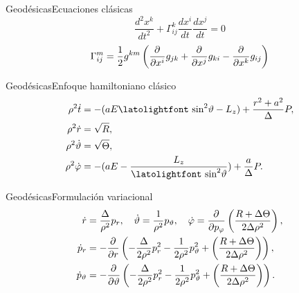 

\begin{frame}{Geodésicas}{Ecuaciones clásicas}
	{\Huge
	\[
		\frac{d^2x^k}{dt^2} + \Gamma^k_{ij} \frac{d x^i}{dt} \frac{d x^j}{dt} = 0
	\]}
	\vfill
	\[
		\Gamma^m_{ij} = \frac{1}{2} g^{km} \left( \frac{\partial^{} }{\partial x^i} g_{jk} + \frac{\partial^{} }{\partial x^j} g_{ki} - \frac{\partial^{} }{\partial x^k}g_{ij} \right)	
	\]
\end{frame}

\begin{frame}{Geodésicas}{Enfoque hamiltoniano clásico}
	\large
	\begin{align*}
		\rho^2 \dot{t} &=-( aE\textrm{\latolightfont sin}^2\vartheta - L_z) + \frac{r^2+a^2}{\Delta}P, \\
		\rho^2 \dot{r} &= \sqrt{R}, \\
		\rho^2 \dot{\vartheta} &= \sqrt{\Theta}, \\
		\rho^2 \dot{\varphi} &=-( aE - \frac{L_z}{\textrm{\latolightfont sin}^2\vartheta}) + \frac{a}{\Delta}P.
	\end{align*}
\end{frame}

\begin{frame}{Geodésicas}{Formulación variacional}
	\large
	\begin{align*}
		\dot{r} &= \frac{\Delta}{\rho^2} p_r, \quad \dot{\vartheta} = \frac{1}{\rho^2}p_\vartheta, \quad
		\dot{\varphi} = \frac{\partial^{} }{\partial p_\varphi}\left( \frac{R + \Delta\Theta}{2\Delta\rho^2} \right), \\
		\dot{p}_r &= - \frac{\partial^{} }{\partial r} \left( - \frac{\Delta}{2\rho^2}p_r^2 - \frac{1}{2\rho^2}p_\vartheta^2 + \left( \frac{R + \Delta\Theta}{2\Delta\rho^2} \right) \right), \\
		\dot{p}_\vartheta &= - \frac{\partial^{} }{\partial \vartheta} \left( - \frac{\Delta}{2\rho^2}p_r^2 - \frac{1}{2\rho^2}p_\vartheta^2 + \left( \frac{R + \Delta\Theta}{2\Delta\rho^2} \right) \right).
	\end{align*}
	
\end{frame}




